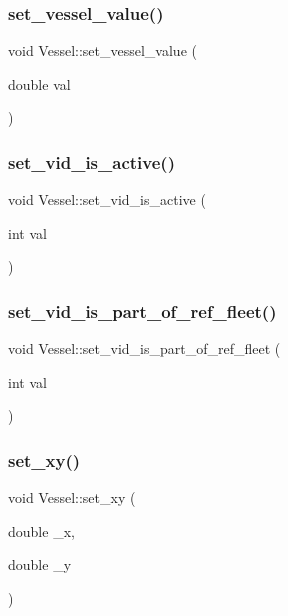 \subsubsection{\texorpdfstring{set\_vessel\_value()}{set\_vessel\_value()}}
{\footnotesize\ttfamily void Vessel\+::set\+\_\+vessel\+\_\+value (\begin{DoxyParamCaption}\item[{double}]{val }\end{DoxyParamCaption})}

\mbox{\label{class_vessel_add4af3b90980d297a8a12b9560e6cbac}} 
\subsubsection{\texorpdfstring{set\_vid\_is\_active()}{set\_vid\_is\_active()}}
{\footnotesize\ttfamily void Vessel\+::set\+\_\+vid\+\_\+is\+\_\+active (\begin{DoxyParamCaption}\item[{int}]{val }\end{DoxyParamCaption})}

\mbox{\label{class_vessel_a85fe8be9658037a5c232ab34b1ed28c2}} 
\subsubsection{\texorpdfstring{set\_vid\_is\_part\_of\_ref\_fleet()}{set\_vid\_is\_part\_of\_ref\_fleet()}}
{\footnotesize\ttfamily void Vessel\+::set\+\_\+vid\+\_\+is\+\_\+part\+\_\+of\+\_\+ref\+\_\+fleet (\begin{DoxyParamCaption}\item[{int}]{val }\end{DoxyParamCaption})}

\mbox{\label{class_vessel_ab2d88cc297c1dfc33286462527e96130}} 
\subsubsection{\texorpdfstring{set\_xy()}{set\_xy()}}
{\footnotesize\ttfamily void Vessel\+::set\+\_\+xy (\begin{DoxyParamCaption}\item[{double}]{\+\_\+x,  }\item[{double}]{\+\_\+y }\end{DoxyParamCaption})}

